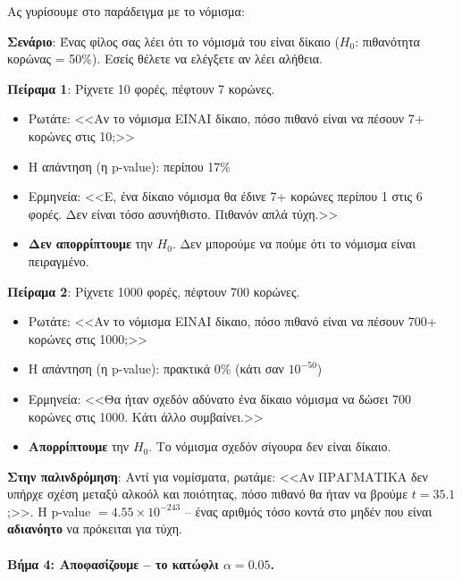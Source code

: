 \documentclass[12pt,a4paper]{article}
\begin{document}
\begin{examplebox}
Ας γυρίσουμε στο παράδειγμα με το νόμισμα:

\textbf{Σενάριο}: Ένας φίλος σας λέει ότι το νόμισμά του είναι δίκαιο ($H_0$: πιθανότητα κορώνας = 50\%). Εσείς θέλετε να ελέγξετε αν λέει αλήθεια.

\textbf{Πείραμα 1}: Ρίχνετε 10 φορές, πέφτουν 7 κορώνες.
\begin{itemize}
    \item Ρωτάτε: <<Αν το νόμισμα ΕΙΝΑΙ δίκαιο, πόσο πιθανό είναι να πέσουν 7+ κορώνες στις 10;>>
    \item Η απάντηση (η p-value): περίπου 17\%
    \item Ερμηνεία: <<Ε, ένα δίκαιο νόμισμα θα έδινε 7+ κορώνες περίπου 1 στις 6 φορές. Δεν είναι τόσο ασυνήθιστο. Πιθανόν απλά τύχη.>>
    \item \textbf{Δεν απορρίπτουμε} την $H_0$. Δεν μπορούμε να πούμε ότι το νόμισμα είναι πειραγμένο.
\end{itemize}

\textbf{Πείραμα 2}: Ρίχνετε 1000 φορές, πέφτουν 700 κορώνες.
\begin{itemize}
    \item Ρωτάτε: <<Αν το νόμισμα ΕΙΝΑΙ δίκαιο, πόσο πιθανό είναι να πέσουν 700+ κορώνες στις 1000;>>
    \item Η απάντηση (η p-value): πρακτικά 0\% (κάτι σαν $10^{-50}$)
    \item Ερμηνεία: <<Θα ήταν σχεδόν αδύνατο ένα δίκαιο νόμισμα να δώσει 700 κορώνες στις 1000. Κάτι άλλο συμβαίνει.>>
    \item \textbf{Απορρίπτουμε} την $H_0$. Το νόμισμα σχεδόν σίγουρα δεν είναι δίκαιο.
\end{itemize}

\textbf{Στην παλινδρόμηση}: Αντί για νομίσματα, ρωτάμε: <<Αν ΠΡΑΓΜΑΤΙΚΑ δεν υπήρχε σχέση μεταξύ αλκοόλ και ποιότητας, πόσο πιθανό θα ήταν να βρούμε $t = 35.1$;>>. Η p-value $= 4.55 \times 10^{-243}$ -- ένας αριθμός τόσο κοντά στο μηδέν που είναι \textbf{αδιανόητο} να πρόκειται για τύχη.
\end{examplebox}

\paragraph{Βήμα 4: Αποφασίζουμε -- το κατώφλι $\alpha = 0.05$.}
\end{document}
